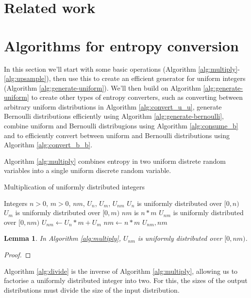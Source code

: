 \documentclass[12pt]{article}
\newtheorem{lemma}{Lemma}
\begin{document}
\section{Related work}


\section{Algorithms for entropy conversion}

In this section we'll start with some basic operations (Algorithm \ref{alg:multiply}-\ref{alg:upsample}), then use this to create an efficient generator for uniform integers (Algorithm \ref{alg:generate-uniform}). We'll then build on Algorithm \ref{alg:generate-uniform} to create other types of entropy converters, such as converting between arbitrary uniform distributions in Algorithm \ref{alg:convert_u_u}, generate Bernoulli distributions efficiently using Algorithm \ref{alg:generate-bernoulli}, combine uniform and Bernoulli distribugions using Algorithm \ref{alg:consume_b} and to efficiently convert between uniform and Bernoulli distributions using Algorithm \ref{alg:convert_b_b}.

Algorithm \ref{alg:multiply} combines entropy in two uniform distrete random variables into a single uniform discrete random variable.

\begin{algorithm}
\caption{Multiplication of uniformly distributed integers}
\label{alg:multiply}
\begin{algorithmic}[1]
    \Require Integers $n>0$, $m>0$, $nm$, $U_n$, $U_m$, $U_{nm}$
    \Require $U_n$ is uniformly distributed over $[0,n)$
    \Require $U_m$ is uniformly distributed over $[0,m)$
\Ensure $nm$ is $n * m$
\Ensure $U_{nm}$ is uniformly distributed over $[0,nm)$
  \State $U_{nm} \gets U_n * m + U_m$
  \State $nm \gets n * m$
  \State \Return $U_{nm}, nm$
\EndProcedure
\end{algorithmic}
\end{algorithm}

\begin{lemma}
In Algorithm \ref{alg:multiply}, $U_{nm}$ is uniformly distributed over $[0,nm)$.
\end{lemma}

\begin{proof}


\end{proof}

Algorithm \ref{alg:divide} is the inverse of Algorithm \ref{alg:multiply}, allowing us to factorise a uniformly distributed integer into two. For this, the sizes of the output distributions must divide the size of the input distribution.
\end{document}
